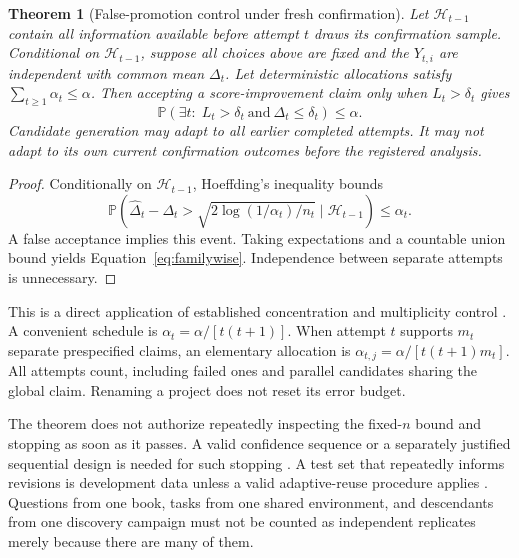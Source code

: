 \documentclass[11pt,letterpaper]{article}
\newcommand{\Prob}{\mathbb P}
\newcommand{\Hist}{\mathcal H}
\newtheorem{theorem}{Theorem}[section]
\theoremstyle{remark}\newtheorem{remark}{Remark}[section]
\begin{document}
\begin{theorem}[False-promotion control under fresh confirmation]
\label{thm:promotion}
Let $\Hist_{t-1}$ contain all information available before attempt $t$ draws its confirmation sample. Conditional on $\Hist_{t-1}$, suppose all choices above are fixed and the $Y_{t,i}$ are independent with common mean $\Delta_t$. Let deterministic allocations satisfy $\sum_{t\geq1}\alpha_t\leq\alpha$. Then accepting a score-improvement claim only when $L_t>\delta_t$ gives
\begin{equation}
\Prob\!\left(\exists t:\;L_t>\delta_t\ \text{and}\ \Delta_t\leq\delta_t\right)\leq\alpha.
\label{eq:familywise}
\end{equation}
Candidate generation may adapt to all earlier completed attempts. It may not adapt to its own current confirmation outcomes before the registered analysis.
\end{theorem}
\begin{proof}
Conditionally on $\Hist_{t-1}$, Hoeffding's inequality bounds
\[
\Prob\!\left(\widehat\Delta_t-\Delta_t>
\sqrt{2\log(1/\alpha_t)/n_t}\mid\Hist_{t-1}\right)\leq\alpha_t.
\]
A false acceptance implies this event. Taking expectations and a countable union bound yields Equation~\eqref{eq:familywise}. Independence between separate attempts is unnecessary.
\end{proof}
This is a direct application of established concentration and multiplicity control \citep{hoeffding1963inequalities}. A convenient schedule is $\alpha_t=\alpha/[t(t+1)]$. When attempt $t$ supports $m_t$ separate prespecified claims, an elementary allocation is $\alpha_{t,j}=\alpha/[t(t+1)m_t]$. All attempts count, including failed ones and parallel candidates sharing the global claim. Renaming a project does not reset its error budget.

The theorem does not authorize repeatedly inspecting the fixed-$n$ bound and stopping as soon as it passes. A valid confidence sequence or a separately justified sequential design is needed for such stopping \citep{howard2021confidence}. A test set that repeatedly informs revisions is development data unless a valid adaptive-reuse procedure applies \citep{dwork2014adaptive}. Questions from one book, tasks from one shared environment, and descendants from one discovery campaign must not be counted as independent replicates merely because there are many of them.
\end{document}
